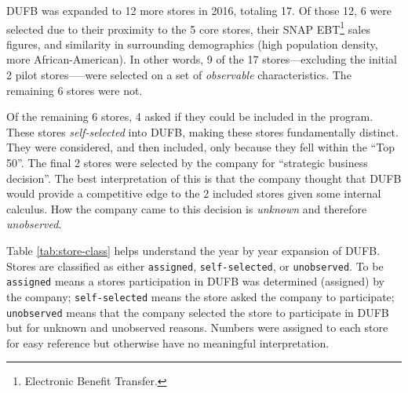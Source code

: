\documentclass[12pt,letterpaperpaper,]{book}
\begin{document}
DUFB was expanded to 12 more stores in 2016, totaling 17. Of those 12, 6
were selected due to their proximity to the 5 core stores, their SNAP
EBT\footnote{Electronic Benefit Transfer.} sales figures, and similarity
in surrounding demographics (high population density, more
African-American). In other words, 9 of the 17 stores---excluding the
initial 2 pilot stores-----were selected on a set of \emph{observable}
characteristics. The remaining 6 stores were not.

Of the remaining 6 stores, 4 asked if they could be included in the
program. These stores \emph{self-selected} into DUFB, making these
stores fundamentally distinct. They were considered, and then included,
only because they fell within the ``Top 50''. The final 2 stores were
selected by the company for ``strategic business decision''. The best
interpretation of this is that the company thought that DUFB would
provide a competitive edge to the 2 included stores given some internal
calculus. How the company came to this decision is \emph{unknown} and
therefore \emph{unobserved}.

Table \ref{tab:store-class} helps understand the year by year expansion
of DUFB. Stores are classified as either \texttt{assigned},
\texttt{self-selected}, or \texttt{unobserved}. To be \texttt{assigned}
means a stores participation in DUFB was determined (assigned) by the
company; \texttt{self-selected} means the store asked the company to
participate; \texttt{unobserved} means that the company selected the
store to participate in DUFB but for unknown and unobserved reasons.
Numbers were assigned to each store for easy reference but otherwise
have no meaningful interpretation.
\end{document}
